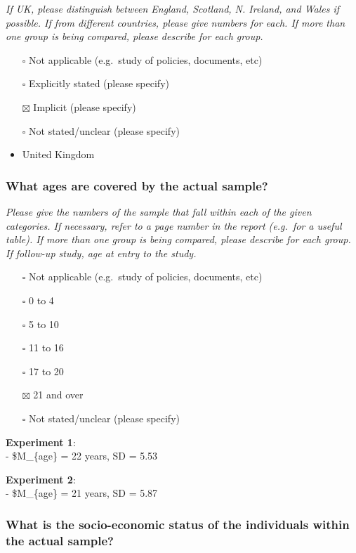 \documentclass[
  doc, a4paper]{apa7}
\providecommand{\tightlist}{%
  \setlength{\itemsep}{0pt}\setlength{\parskip}{0pt}}
\begin{document}
\emph{If UK, please distinguish between England, Scotland, N. Ireland, and Wales if possible. If from different countries, please give numbers for each. If more than one group is being compared, please describe for each group.}

\begin{itemize}
\item[$\square$]
  Not applicable (e.g.~study of policies, documents, etc)
\item[$\square$]
  Explicitly stated (please specify)
\item[$\boxtimes$]
  Implicit (please specify)
\item[$\square$]
  Not stated/unclear (please specify)
\item
  United Kingdom
\end{itemize}

\subsubsection{What ages are covered by the actual sample?}\label{what-ages-are-covered-by-the-actual-sample}

\emph{Please give the numbers of the sample that fall within each of the given categories. If necessary, refer to a page number in the report (e.g.~for a useful table). If more than one group is being compared, please describe for each group. If follow-up study, age at entry to the study.}

\begin{itemize}
\tightlist
\item[$\square$]
  Not applicable (e.g.~study of policies, documents, etc)
\item[$\square$]
  0 to 4
\item[$\square$]
  5 to 10
\item[$\square$]
  11 to 16
\item[$\square$]
  17 to 20
\item[$\boxtimes$]
  21 and over
\item[$\square$]
  Not stated/unclear (please specify)
\end{itemize}

\textbf{Experiment 1}:\\
- \$M\_\{age\} = 22 years, SD = 5.53

\textbf{Experiment 2}:\\
- \$M\_\{age\} = 21 years, SD = 5.87

\subsubsection{What is the socio-economic status of the individuals within the actual sample?}\label{what-is-the-socio-economic-status-of-the-individuals-within-the-actual-sample}
\end{document}
